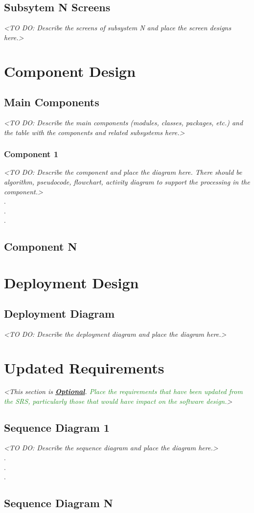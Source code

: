 \documentclass[12pt,a4paper]{report}
\begin{document}
\section{Subsytem N Screens}
\textit{<TO DO: Describe the screens of subsystem N and place the screen designs here.>}

\chapter{Component Design}
\section{Main Components}
\textit{<TO DO: Describe the main components (modules, classes, packages, etc.) and the table with the
components and related subsystems here.>}

\subsection{Component 1}
\textit{<TO DO: Describe the component and place the diagram here. There should be algorithm,
pseudocode, flowchart, activity diagram to support the processing in the component.>} \\
\hspace*{3cm} . \\
\hspace*{3cm} . \\
\hspace*{3cm} . 
\section{Component N}

\chapter{Deployment Design}
\section{Deployment Diagram}
\textit{<TO DO: Describe the deployment diagram and place the diagram here.>}

\chapter{Updated Requirements}
\textit{<This section is \underline{\textbf{Optional}}. \textcolor{ForestGreen}{Place the requirements that have been updated from the SRS,
particularly those that would have impact on the software design.}>}
\section{Sequence Diagram 1}
\textit{<TO DO: Describe the sequence diagram and place the diagram here.>} \\
\hspace*{3cm} . \\
\hspace*{3cm} . \\
\hspace*{3cm} . 
\section{Sequence Diagram N}
\end{document}
